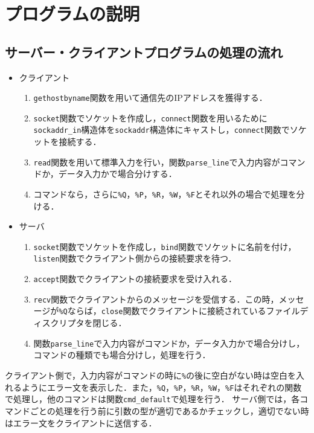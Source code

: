 \documentclass{jarticle}[11pt]
\begin{document}
    \section{プログラムの説明}
\subsection{サーバー・クライアントプログラムの処理の流れ}
\begin{itemize}
\item クライアント 
  \begin{enumerate}
  \item \verb|gethostbyname|関数を用いて通信先のIPアドレスを獲得する．
  \item \verb|socket|関数でソケットを作成し，\verb|connect|関数を用いるために\verb|sockaddr_in|構造体を\verb|sockaddr|構造体にキャストし，\verb|connect|関数でソケットを接続する．
  \item \verb|read|関数を用いて標準入力を行い，関数\verb|parse_line|で入力内容がコマンドか，データ入力かで場合分けする．
  \item コマンドなら，さらに\verb|%Q|，\verb|%P|，\verb|%R|，\verb|%W|，\verb|%F|とそれ以外の場合で処理を分ける．
  \end{enumerate}

\item サーバ
  \begin{enumerate}
  \item \verb|socket|関数でソケットを作成し，\verb|bind|関数でソケットに名前を付け，\verb|listen|関数でクライアント側からの接続要求を待つ．
  \item \verb|accept|関数でクライアントの接続要求を受け入れる．
  \item \verb|recv|関数でクライアントからのメッセージを受信する．この時，メッセージが\verb|%Q|ならば，\verb|close|関数でクライアントに接続されているファイルディスクリプタを閉じる．
  \item 関数\verb|parse_line|で入力内容がコマンドか，データ入力かで場合分けし，コマンドの種類でも場合分けし，処理を行う．
  \end{enumerate}
\end{itemize}

クライアント側で，入力内容がコマンドの時に\verb|%|の後に空白がない時は空白を入れるようにエラー文を表示した．また，\verb|%Q|，\verb|%P|，\verb|%R|，\verb|%W|，\verb|%F|はそれぞれの関数で処理し，他のコマンドは関数\verb|cmd_default|で処理を行う．
サーバ側では，各コマンドごとの処理を行う前に引数の型が適切であるかチェックし，適切でない時はエラー文をクライアントに送信する．\\
\end{document}
